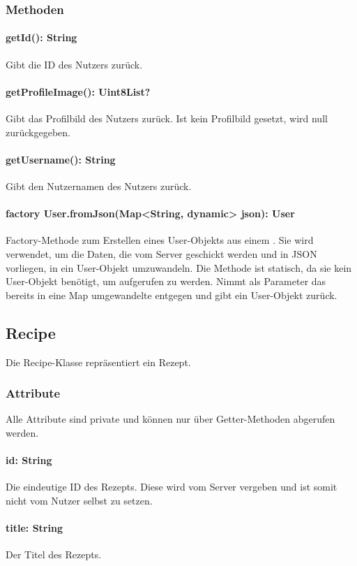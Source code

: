 \documentclass[parskip=full]{scrartcl}
\begin{document}
\subsubsection{Methoden}
\paragraph{getId(): String}
Gibt die ID des Nutzers zurück.
\paragraph{getProfileImage(): Uint8List?}
Gibt das Profilbild des Nutzers zurück. Ist kein Profilbild gesetzt, wird null zurückgegeben.
\paragraph{getUsername(): String}
Gibt den Nutzernamen des Nutzers zurück.
\paragraph{factory User.fromJson(Map<String, dynamic> json): User} Factory-Methode zum Erstellen eines User-Objekts aus einem . Sie wird verwendet, um die Daten, die vom Server geschickt werden und in \Gls{JSON} vorliegen, in ein User-Objekt umzuwandeln. Die Methode ist statisch, da sie kein User-Objekt benötigt, um aufgerufen zu werden. Nimmt als Parameter das bereits in eine Map umgewandelte  entgegen und gibt ein User-Objekt zurück.

\subsection{Recipe}
Die Recipe-Klasse repräsentiert ein Rezept.
\subsubsection{Attribute}
Alle Attribute sind private und können nur über Getter-Methoden abgerufen werden.
\paragraph{id: String}
Die eindeutige ID des Rezepts. Diese wird vom Server vergeben und ist somit nicht vom Nutzer selbst zu setzen.
\paragraph{title: String}
Der Titel des Rezepts.
\end{document}
